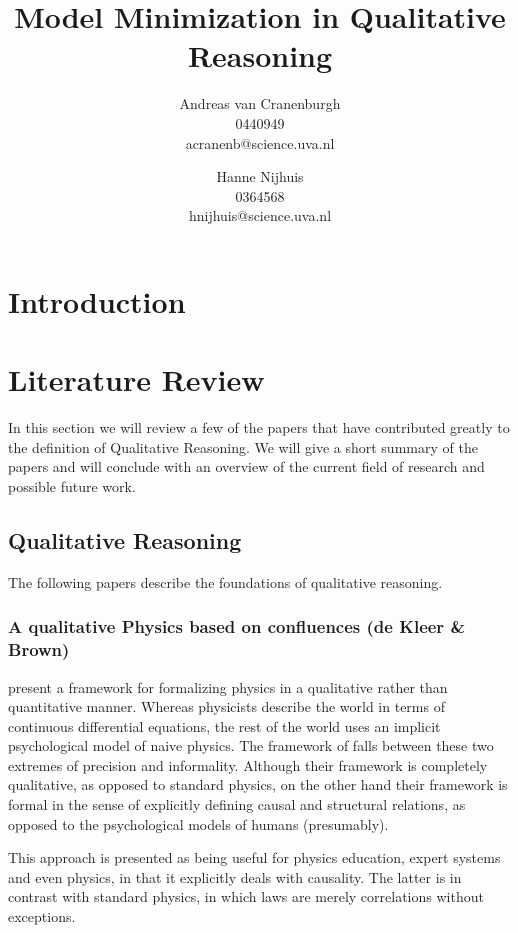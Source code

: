 \documentclass{article}
\title{Model Minimization in Qualitative Reasoning}
\author{Andreas van Cranenburgh \\ 0440949 \\ acranenb@science.uva.nl 
\and Hanne Nijhuis \\ 0364568 \\ hnijhuis@science.uva.nl}
\begin{document}
\maketitle

\begin{abstract}
\end{abstract}

\section{Introduction}

\section{Literature Review}
In this section we will review a few of the papers that have contributed
greatly to the definition of Qualitative Reasoning. We will give a short
summary of the papers and will conclude with an overview of the current field
of research and possible future work.

\subsection{Qualitative Reasoning}
The following papers describe the foundations of qualitative reasoning.

\subsubsection{A qualitative Physics based on confluences (de Kleer \& Brown)}

\cite{kleer} present a framework for formalizing physics in a qualitative
rather than quantitative manner. Whereas physicists describe the world in terms
of continuous differential equations, the rest of the world uses an implicit
psychological model of naive physics. The framework of \cite{kleer} falls between
these two extremes of precision and informality. Although their framework is completely
qualitative, as opposed to standard physics, on the other hand their framework
is formal in the sense of explicitly defining causal and structural relations, as opposed
to the psychological models of humans (presumably).

This approach is presented as being useful for physics education, expert
systems and even physics, in that it explicitly deals with causality. The
latter is in contrast with standard physics, in which laws are merely
correlations without exceptions.
\end{document}
